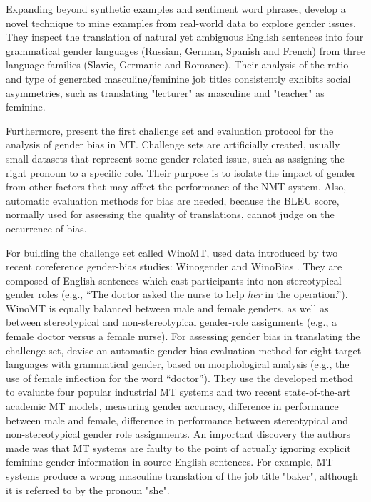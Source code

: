 Expanding beyond synthetic examples and sentiment word phrases, \citet{Gonen_2020} develop a novel technique to mine examples from real-world data to explore gender issues. They inspect the translation of natural yet ambiguous English sentences into four grammatical gender languages (Russian, German, Spanish and French) from three language families (Slavic, Germanic and Romance). Their analysis of the ratio and type of generated masculine/feminine job titles consistently exhibits social asymmetries, such as translating "lecturer" as masculine and "teacher" as feminine.

Furthermore, \citet{Stanovsky_2019} present the first challenge set and evaluation protocol for the analysis of gender bias in MT. Challenge sets are artificially created, usually small datasets that represent some gender-related issue, such as assigning the right pronoun to a specific role. Their purpose is to isolate the impact of gender from other factors that may affect the performance of the NMT system. Also, automatic evaluation methods for bias are needed, because the BLEU score, normally used for assessing the quality of translations, cannot judge on the occurrence of bias. 

For building the challenge set called WinoMT, \citet{Stanovsky_2019} used data introduced by two recent coreference gender-bias studies: Winogender \parencite{Rudinger_2018_coreference} and WinoBias \parencite{Zhao_2018_coreference}. They are composed of English sentences which cast participants into non-stereotypical gender roles (e.g., “The doctor asked the nurse to help \textit{her} in the operation.”). WinoMT is equally balanced between male and female genders, as well as between stereotypical and non-stereotypical gender-role assignments (e.g., a female doctor versus a female nurse). 
For assessing gender bias in translating the challenge set, \citet{Stanovsky_2019} devise an automatic gender bias evaluation method for eight target languages with grammatical gender, based on morphological analysis (e.g., the use of female inflection for the word “doctor”). They use the developed method to evaluate four popular industrial MT systems and two recent state-of-the-art academic MT models, measuring gender accuracy, difference in performance between male and female, difference in performance between stereotypical and non-stereotypical gender role assignments. An important discovery the authors made was that MT systems are faulty to the point of actually ignoring explicit feminine gender information in source English sentences. For example, MT systems produce a wrong masculine translation of the job title "baker", although it is referred to by the pronoun "she".

